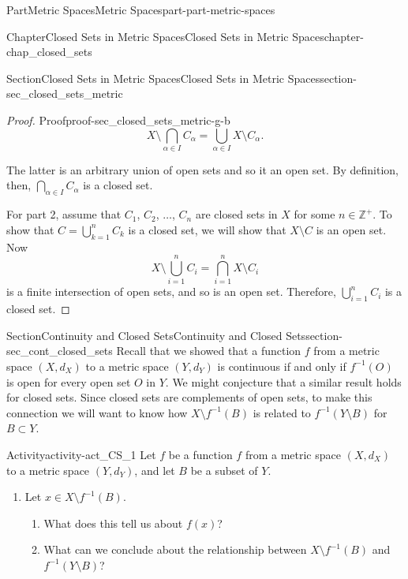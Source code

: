 \documentclass[oneside,10pt,]{book}
\numberwithin{equation}{chapter}
\newcommand{\Z}{\mathbb{Z}}
\begin{document}
\begin{partptx}{Part}{Metric Spaces}{}{Metric Spaces}{}{}{part-part-metric-spaces}
\begin{chapterptx}{Chapter}{Closed Sets in Metric Spaces}{}{Closed Sets in Metric Spaces}{}{}{chapter-chap_closed_sets}
\begin{sectionptx}{Section}{Closed Sets in Metric Spaces}{}{Closed Sets in Metric Spaces}{}{}{section-sec_closed_sets_metric}
\begin{proof}{Proof}{}{proof-sec_closed_sets_metric-g-b}
\begin{equation*}
X \setminus \bigcap_{\alpha \in I} C_{\alpha} = \bigcup_{\alpha \in I} X \setminus C_{\alpha}\text{.}
\end{equation*}
%
\par
The latter is an arbitrary union of open sets and so it an open set. By definition, then, \(\bigcap_{\alpha \in I} C_{\alpha}\) is a closed set.%
\par
For part 2, assume that \(C_1\), \(C_2\), \(\ldots\), \(C_n\) are closed sets in \(X\) for some \(n \in \Z^+\). To show that \(C = \bigcup_{k=1}^n C_k\) is a closed set, we will show that \(X \setminus C\) is an open set. Now%
\begin{equation*}
X \setminus \bigcup_{i=1}^n C_{i} = \bigcap_{i=1}^n X \setminus C_{i}
\end{equation*}
is a finite intersection of open sets, and so is an open set. Therefore, \(\bigcup_{i=1}^n C_{i}\) is a closed set.%
\end{proof}
\end{sectionptx}
%
%
\typeout{************************************************}
\typeout{************************************************}
%
\begin{sectionptx}{Section}{Continuity and Closed Sets}{}{Continuity and Closed Sets}{}{}{section-sec_cont_closed_sets}
Recall that we showed that a function \(f\) from a metric space \((X,d_X)\) to a metric space \((Y,d_Y)\) is continuous if and only if \(f^{-1}(O)\) is open for every open set \(O\) in \(Y\). We might conjecture that a similar result holds for closed sets. Since closed sets are complements of open sets, to make this connection we will want to know how \(X \setminus f^{-1}(B)\) is related to \(f^{-1}(Y \setminus B)\) for \(B \subset Y\).%
\begin{activity}{Activity}{}{activity-act_CS_1}%
Let \(f\) be a function \(f\) from a metric space \((X,d_X)\) to a metric space \((Y,d_Y)\), and let \(B\) be a subset of \(Y\).%
\begin{enumerate}[font=\bfseries,label=(\alph*),ref=\alph*]%
\item{}Let \(x \in X \setminus f^{-1}(B)\).%
\begin{enumerate}[font=\bfseries,label=(\roman*),ref=\theenumi.\roman*]%
\item{}What does this tell us about \(f(x)\)?%
\item{}What can we conclude about the relationship between \(X \setminus f^{-1}(B)\) and \(f^{-1}(Y \setminus B)\)?%

\end{enumerate}
\end{enumerate}
\end{activity}
\end{sectionptx}
\end{chapterptx}
\end{partptx}
\end{document}
